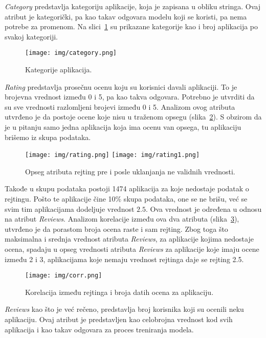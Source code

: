 \documentclass[a4paper,12pt,titlepage]{article}
\begin{document}
\emph{Category} predstavlja kategoriju aplikacije, koja je zapisana u obliku stringa. Ovaj atribut je kategorički, pa kao takav odgovara modelu koji se koristi, pa nema potrebe za promenom. Na slici~\ref{Category} su prikazane kategorije kao i broj aplikacija po svakoj kategoriji.

\begin{figure}[ht!]
\centering
\texttt{[image: img/category.png]}
\caption{Kategorije aplikacija.}
\label{Category}
\end{figure} 

\emph{Rating} predstavlja prosečnu ocenu koju su korisnici davali aplikaciji. To je brojevna vrednost između 0 i 5, pa kao takva odgovara. Potrebno je utvrditi da su sve vrednosti razlomljeni brojevi između 0 i 5. Analizom ovog atributa utvrđeno je da postoje ocene koje nisu u traženom opsegu (slika~\ref{Rating}). S obzirom da je u pitanju samo jedna aplikacija koja ima ocenu van opsega, tu aplikaciju brišemo iz skupa podataka.

\begin{figure}[ht!]
\centering
\texttt{[image: img/rating.png]}
\texttt{[image: img/rating1.png]}
\caption{Opseg atributa rejting pre i posle uklanjanja ne validnih vrednosti.}
\label{Rating}
\end{figure} 

Takođe u skupu podataka postoji 1474 aplikacija za koje nedostaje podatak o rejtingu. Pošto te aplikacije čine 10\% skupa podataka, one se ne brišu, već se svim tim aplikacijama dodeljuje vrednost $2.5$. Ova vrednost je određena u odnosu na atribut \emph{Reviews}. Analizom korelacije između ova dva atributa (slika~\ref{Corr}), utvrđeno je da porastom broja ocena raste i sam rejting. Zbog toga što maksimalna i srednja vrednost atributa  \emph{Reviews}, za aplikacije kojima nedostaje ocena, spadaju u opseg vrednosti atributa \emph{Reviews} za aplikacije koje imaju ocene između 2 i 3, aplikacijama koje nemaju vrednost rejtinga daje se rejting 2.5. 

\begin{figure}[ht!]
\centering
\texttt{[image: img/corr.png]}
\caption{Korelacija između rejtinga i broja datih ocena za aplikaciju.}
\label{Corr}
\end{figure} 

\emph{Reviews} kao što je već rečeno, predstavlja broj korisnika koji su ocenili neku aplikaciju. Ovaj atribut je predstavljen kao celobrojna vrednost kod svih aplikacija i kao takav odgovara za proces treniranja modela. 
\end{document}
